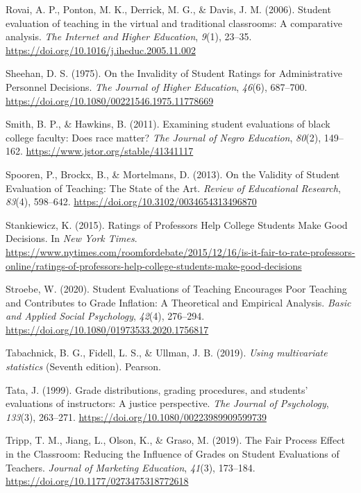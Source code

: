 \documentclass[
  man,mask]{apa7}
\newlength{\cslhangindent}
\newenvironment{CSLReferences}[2] %
 {\begin{list}{}{%
  \setlength{\itemindent}{0pt}
  \setlength{\leftmargin}{0pt}
  \setlength{\parsep}{0pt}
  \ifodd #1
   \setlength{\leftmargin}{\cslhangindent}
   \setlength{\itemindent}{-1\cslhangindent}
  \fi
  \setlength{\itemsep}{#2\baselineskip}}}
 {\end{list}}
\begin{document}
\begin{CSLReferences}{1}{0}
Rovai, A. P., Ponton, M. K., Derrick, M. G., \& Davis, J. M. (2006). Student evaluation of teaching in the virtual and traditional classrooms: A comparative analysis. \emph{The Internet and Higher Education}, \emph{9}(1), 23--35. \url{https://doi.org/10.1016/j.iheduc.2005.11.002}

Sheehan, D. S. (1975). On the Invalidity of Student Ratings for Administrative Personnel Decisions. \emph{The Journal of Higher Education}, \emph{46}(6), 687--700. \url{https://doi.org/10.1080/00221546.1975.11778669}

Smith, B. P., \& Hawkins, B. (2011). Examining student evaluations of black college faculty: Does race matter? \emph{The Journal of Negro Education}, \emph{80}(2), 149--162. \url{https://www.jstor.org/stable/41341117}

Spooren, P., Brockx, B., \& Mortelmans, D. (2013). On the Validity of Student Evaluation of Teaching: The State of the Art. \emph{Review of Educational Research}, \emph{83}(4), 598--642. \url{https://doi.org/10.3102/0034654313496870}

Stankiewicz, K. (2015). Ratings of {Professors} {Help} {College} {Students} {Make} {Good} {Decisions}. In \emph{New York Times}. \url{https://www.nytimes.com/roomfordebate/2015/12/16/is-it-fair-to-rate-professors-online/ratings-of-professors-help-college-students-make-good-decisions}

Stroebe, W. (2020). Student Evaluations of Teaching Encourages Poor Teaching and Contributes to Grade Inflation: A Theoretical and Empirical Analysis. \emph{Basic and Applied Social Psychology}, \emph{42}(4), 276--294. \url{https://doi.org/10.1080/01973533.2020.1756817}

Tabachnick, B. G., Fidell, L. S., \& Ullman, J. B. (2019). \emph{Using multivariate statistics} (Seventh edition). Pearson.

Tata, J. (1999). Grade distributions, grading procedures, and students' evaluations of instructors: A justice perspective. \emph{The Journal of Psychology}, \emph{133}(3), 263--271. \url{https://doi.org/10.1080/00223989909599739}

Tripp, T. M., Jiang, L., Olson, K., \& Graso, M. (2019). The Fair Process Effect in the Classroom: Reducing the Influence of Grades on Student Evaluations of Teachers. \emph{Journal of Marketing Education}, \emph{41}(3), 173--184. \url{https://doi.org/10.1177/0273475318772618}


\end{CSLReferences}
\end{document}
